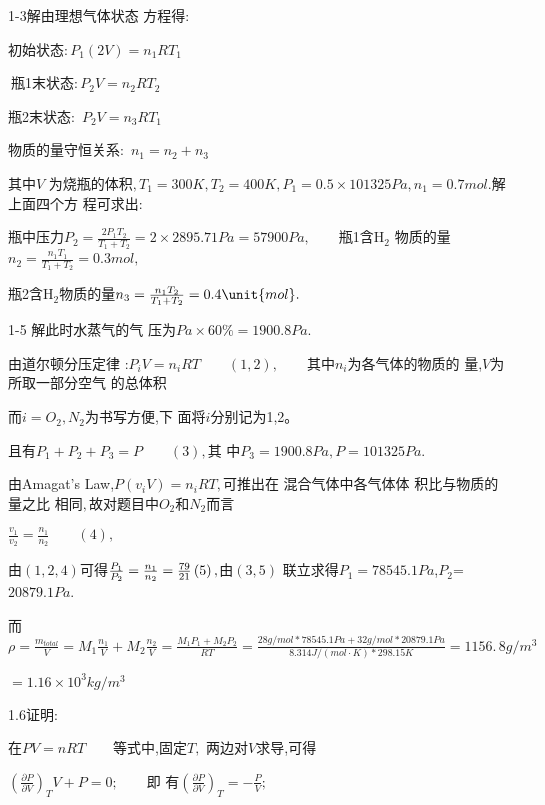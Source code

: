 \documentclass{article}
\begin{document}
1-3解\qquad 由理想气体状态%
方程得$:$

\qquad 初始状态$:P_{1}(2V)=n_{1}RT_{1}$

$\ $瓶1末状态$:P_{2}V=n_{2}RT_{2}$

\qquad 瓶2末状态$:$ $P_{2}V=n_{3}RT_{1}$

\qquad 物质的量守恒关系$:$ $%
n_{1}=n_{2}+n_{3}$

其中$V$ 为烧瓶的体积$%
,T_{1}=300\unit{K},T_{2}=400\unit{K},P_{1}=0.5\times 101325\unit{Pa}%
,n_{1}=0.7\unit{mol}.$解上面四个方%
程可求出$:$

瓶中压力$P_{2}=\frac{2P_{1}T_{2}}{T_{1}+T_{2}}%
=2\times 2895.71\unit{Pa}=57900\unit{Pa},\qquad $瓶1含H$_{2}$%
物质的量$n_{2}=\frac{n_{1}T_{1}}{T_{1}+T_{2}}=0.3%
\unit{mol},$

瓶2含H$_{2}$物质的量$n_{3}=\frac{%
n_{1}T_{2}}{T_{1}+T_{2}}=0.4\unit{mol}.$

1-5 解\qquad 此时水蒸气的气%
压为$\unit{Pa}\times 60\%=1900.8\unit{Pa}.$

\qquad 由道尔顿分压定律%
:\qquad $P_{i}V=n_{i}RT\qquad \left( 1,2\right) ,\qquad $其中$%
n_{i}$为各气体的物质的%
量,$V$为所取一部分空气%
的总体积

而$i=O_{2},N_{2}$为书写方便,下%
面将$i$分别记为1,2。

且有\qquad $P_{1}+P_{2}+P_{3}=P\qquad \left( 3\right) ,$其%
中\qquad $P_{3}=1900.8\unit{Pa},P=101325Pa.$

由Amagat's Law,$P(v_{i}V)=n_{i}RT,$可推出在%
混合气体中各气体体%
积比与物质的量之比%
相同$,$故对题目中$O_{2}$和$%
N_{2}$而言

$\frac{v_{1}}{v_{2}}=\frac{n_{1}}{n_{2}}\qquad \left( 4\right) ,$

由$\left( 1,2,4\right) $可得$\frac{P_{1}}{P_{2}}=\frac{%
n_{1}}{n_{2}}=\frac{79}{21}\left( 5\right) ,$由$\left( 3,5\right) $%
联立求得\qquad $P_{1}=78545.1\unit{Pa}$,$P_{2}$=$%
20879.1\unit{Pa}$.

而$\rho =\frac{m_{total}}{V}=M_{1}\frac{n_{1}}{V}+M_{2}\frac{n_{2}}{V}=%
\frac{M_{1}P_{1}+M_{2}P_{2}}{RT}=\frac{28\unit{g}/\unit{mol}\ast 78545.1%
\unit{Pa}+32\unit{g}/\unit{mol}\ast 20879.1\unit{Pa}}{8.314\unit{J}/\left( 
\unit{mol}\cdot \unit{K}\right) \ast 298.15\unit{K}}=\allowbreak
1156.\,\allowbreak 8\unit{g}/\unit{m}^{3}$

$=1.16\times 10^{3}\unit{kg}/\unit{m}^{3}$

1.6\qquad 证明:

在\qquad $PV=nRT\qquad $等式中,固定$T,$%
两边对$V$求导,可得

$\left( \frac{\partial P}{\partial V}\right) _{T}V+P=0;\qquad $即%
有\qquad $\left( \frac{\partial P}{\partial V}\right) _{T}=-\frac{P}{V}%
;$
\end{document}
